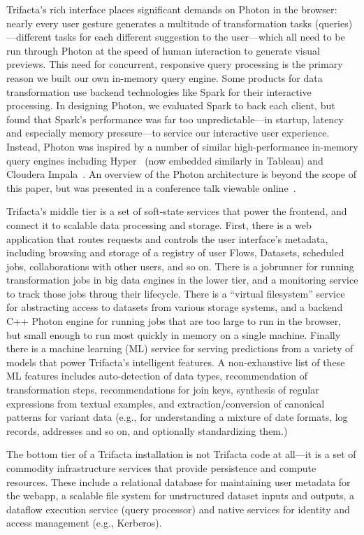 \documentclass[11pt]{article}
\begin{document}
Trifacta's rich interface places significant demands on Photon in the browser: nearly every user gesture generates a multitude of transformation tasks (queries)---different tasks for each different suggestion to the user---which all need to be run through Photon at the speed of human interaction 
to generate visual previews. This need for concurrent, responsive query processing is the primary reason we built our own in-memory query engine.
Some products for data transformation use backend technologies like Spark for their interactive processing. In designing Photon, we evaluated Spark to back each client, but found that Spark's performance was far too unpredictable---in startup, latency and especially memory pressure---to service our interactive user experience. Instead, Photon was inspired by a number of similar high-performance in-memory query engines including Hyper~\cite{kemper2011hyper} (now embedded similarly in Tableau) and Cloudera Impala~\cite{impala}. An overview of the Photon architecture is beyond the scope of this paper, but was presented in a conference talk viewable online~\cite{photon}.

Trifacta's middle tier is a set of soft-state services that power the frontend, and connect it to scalable data processing and storage. First, there is a web application that routes requests and controls the user interface's metadata, including browsing and storage of a registry of user Flows, Datasets, scheduled jobs, collaborations with other users, and so on. There is a jobrunner for running transformation jobs in big data engines in the lower tier, and a monitoring service to track those jobs throug their lifecycle. There is a ``virtual filesystem'' service for abstracting access to datasets from various storage systems, and a backend C++ Photon engine for running jobs that are too large to run in the browser, but small enough to run most quickly in memory on a single machine. Finally there is a machine learning (ML) service for serving predictions from a variety of models that power Trifacta's intelligent features. A non-exhaustive list of these ML features includes auto-detection of data types, recommendation of transformation steps, recommendations for join keys, synthesis of regular expressions from textual examples, and extraction/conversion of canonical patterns for variant data (e.g., for understanding a mixture of date formats, log records, addresses and so on, and optionally standardizing them.) 

The bottom tier of a Trifacta installation is not Trifacta code at all---it is a set of commodity infrastructure services that provide persistence and compute resources. These include a relational database for maintaining user metadata for the webapp, a scalable file system for unstructured dataset inputs and outputs, a dataflow execution service (query processor) and native services for identity and access management (e.g., Kerberos). 
\end{document}
